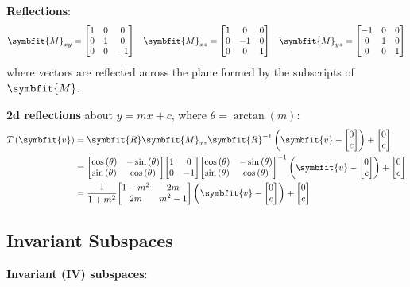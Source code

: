 \documentclass{article}
\begin{document}
\begin{minipage}[t]{126.1962963mm}
    \textbf{Reflections}:
    \begin{align*}
        \symbfit{M}_{xy}=\mqty[1  & 0 & 0 \\ 0 & 1 & 0 \\ 0 & 0 & -1] \quad
        \symbfit{M}_{xz}=\mqty[1  & 0 & 0 \\ 0 & -1 & 0 \\ 0 & 0 & 1] \quad
        \symbfit{M}_{yz}=\mqty[-1 & 0 & 0 \\ 0 & 1 & 0 \\ 0 & 0 & 1]
    \end{align*}
    where vectors are reflected across the plane formed by the subscripts of
    $\symbfit{M}$.

    \textbf{2d reflections} about $y=mx + c$, where $\theta=\arctan{\left( m \right)}$:
    \begin{align*}
        T\left( \symbfit{v} \right) & = \symbfit{R} \symbfit{M}_{xz} \symbfit{R}^{-1} \left( \symbfit{v} - \mqty[0                                \\ c] \right) + \mqty[0 \\ c] \\
                                    & = \mqty[\cos{\left( \theta \right)}                                          & -\sin{\left( \theta \right)} \\ \sin{\left( \theta \right)} & \cos{\left( \theta \right)}] \mqty[1 & 0 \\ 0 & -1] \mqty[\cos{\left( \theta \right)} & -\sin{\left( \theta \right)} \\ \sin{\left( \theta \right)} & \cos{\left( \theta \right)}]^{-1} \left( \symbfit{v} - \mqty[0 \\ c] \right) + \mqty[0 \\ c] \\
                                    & = \frac{1}{1+m^2}\mqty[1-m^2                                                 & 2m                           \\ 2m & m^2-1] \left( \symbfit{v} - \mqty[0 \\ c] \right) + \mqty[0 \\ c] \\
    \end{align*}
    \begin{multicols*}{2}
        \section*{Invariant Subspaces}
        \textbf{Invariant (IV) subspaces}:


\end{multicols*}
\end{minipage}
\end{document}
